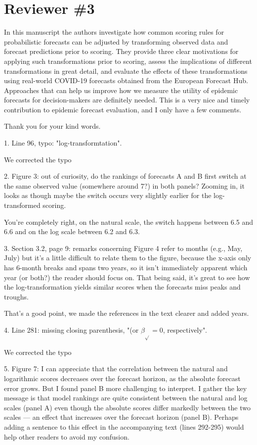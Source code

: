 \documentclass{article}
\newcommand{\black}{\color{black}}
\newcommand{\blue}{\color{blue}}
\begin{document}
\blue
\section{Reviewer \#3}

In this manuscript the authors investigate how common scoring rules for probabilistic forecasts can be adjusted by transforming observed data and forecast predictions prior to scoring. They provide three clear motivations for applying such transformations prior to scoring, assess the implications of different transformations in great detail, and evaluate the effects of these transformations using real-world COVID-19 forecasts obtained from the European Forecast Hub. Approaches that can help us improve how we measure the utility of epidemic forecasts for decision-makers are definitely needed. This is a very nice and timely contribution to epidemic forecast evaluation, and I only have a few comments.

\black
Thank you for your kind words. 

\blue
1. Line 96, typo: "log-transformtation".

\black
We corrected the typo

\blue
2. Figure 3: out of curiosity, do the rankings of forecasts A and B first switch at the same observed value (somewhere around 7?) in both panels? Zooming in, it looks as though maybe the switch occurs very slightly earlier for the log-transformed scoring.

\black
You're completely right, on the natural scale, the switch happens between 6.5 and 6.6 and on the log scale between 6.2 and 6.3. 

\blue
3. Section 3.2, page 9: remarks concerning Figure 4 refer to months (e.g., May, July) but it's a little difficult to relate them to the figure, because the x-axis only has 6-month breaks and spans two years, so it isn't immediately apparent which year (or both?) the reader should focus on. That being said, it's great to see how the log-transformation yields similar scores when the forecasts miss peaks and troughs.

\black
That's a good point, we made the references in the text clearer and added years. 

\blue
4. Line 281: missing closing parenthesis, "(or $\beta_{\sqrt{}} = 0$, respectively".

\black
We corrected the typo

\blue
5. Figure 7: I can appreciate that the correlation between the natural and logarithmic scores decreases over the forecast horizon, as the absolute forecast error grows. But I found panel B more challenging to interpret. I gather the key message is that model rankings are quite consistent between the natural and log scales (panel A) even though the absolute scores differ markedly between the two scales — an effect that increases over the forecast horizon (panel B). Perhaps adding a sentence to this effect in the accompanying text (lines 292-295) would help other readers to avoid my confusion.
\end{document}
